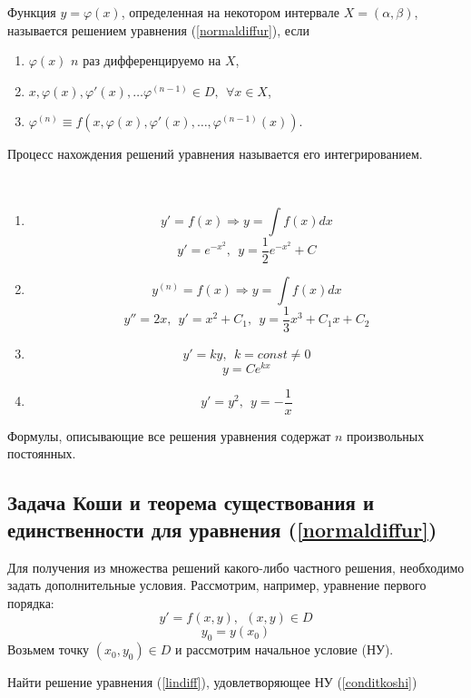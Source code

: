   \begin{df}
  Функция $y = \varphi(x)$, определенная на некотором интервале $X = (\alpha, \beta)$, называется решением уравнения (\ref{normaldiffur}), если 
  \begin{enumerate}
  \item $\varphi(x)$ $n$ раз дифференцируемо на $X$,
  \item $x, \varphi(x), \varphi'(x), \ldots \varphi^{(n - 1)} \in D,~~ \forall x \in X$,
  \item $\varphi^{(n)} \equiv f(x, \varphi(x), \varphi'(x), \ldots, \varphi^{(n - 1)}(x))$.
  \end{enumerate}
  \end{df}
  \begin{ntc}
  Процесс нахождения решений уравнения называется его интегрированием.
  \end{ntc}
  
  \begin{xmp}
  ~
  \begin{enumerate}
  \item $$ y' = f(x) \Rightarrow y = \int f(x) dx $$
  $$ y' = e^{-x^2},~~ y = \frac{1}{2}e^{-x^2} + C $$
  \item $$ y^{(n)} = f(x) \Rightarrow y = \int f(x) dx $$
  $$ y'' = 2x,~~ y' = x^2 + C_1,~~ y = \frac{1}{3}x^3 + C_1 x + C_2 $$ 
  \item $$ y' = ky,~~ k = const \neq 0 $$
  $$ y = Ce^{kx} $$
  \item $$ y' = y^2,~~ y = -\frac{1}{x} $$
  \end{enumerate}
  \end{xmp}

  \begin{ntc}
  Формулы, описывающие все решения уравнения содержат $n$ произвольных постоянных.
  \end{ntc}  
  
  \subsection{Задача Коши и теорема существования и единственности для уравнения (\ref{normaldiffur})}
  Для получения из множества решений какого-либо частного решения, необходимо задать дополнительные условия. Рассмотрим, например, уравнение первого порядка:
  \begin{equation}
  \label{lindiff}
     y' = f(x, y),~~ (x,y) \in D
  \end{equation}
  \begin{equation}
  \label{conditkoshi}
  y_0 = y(x_0)
  \end{equation}
  Возьмем точку $(x_0, y_0) \in D$ и рассмотрим начальное условие (НУ).
  \begin{df}
  Найти решение уравнения (\ref{lindiff}), удовлетворяющее НУ (\ref{conditkoshi})
  \end{df}
  
